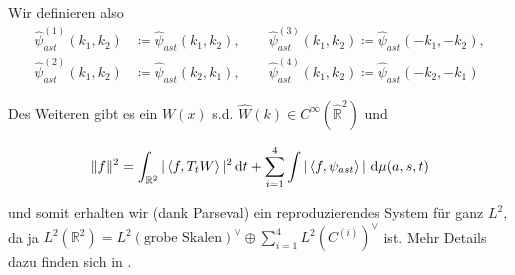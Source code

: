 Wir definieren also
\begin{align}
    \hat \psi_{ast}^{(1)} (k_1, k_2) &\coloneqq \hat\psi_{ast} (k_1,k_2),
    \qquad
    \hat\psi_{ast}^{(3)}(k_1,k_2) \coloneqq \hat\psi_{ast} (-k_1,-k_2),
    \nonumber\\
    \hat \psi_{ast}^{(2)} (k_1, k_2) &\coloneqq \hat\psi_{ast} (k_2,k_1),
    \qquad
    \hat\psi_{ast}^{(4)}(k_1, k_2) \coloneqq \hat\psi_{ast} (-k_2,-k_1)
    \label{eq:psi(i)}
\end{align}

Des Weiteren gibt es ein $W(x)$ s.d. $\hat W(k) \in C^\infty (\hat{\mathbb{R}}^2)$ und

\begin{align*}
    \Vert f \Vert^2 =
    \int_{\mathbb{R}^2} |\left\langle f, T_t W \right\rangle|^2 \mathop{}\!\mathrm{d} t
    + \sum_{i=1}^4 \int |\left\langle f, \psi_{ast} \right\rangle|
    \, \mathop{}\!\mathrm{d} \mu (a,s,t)
\end{align*}

und somit erhalten wir (dank Parseval) ein reproduzierendes System für ganz $L^2$, da ja
$L^2 (\mathbb{R}^2) = L^2 (\textrm{grobe Skalen})^\vee \oplus \sum_{i=1}^4 L^2 \left(C^{(i)}\right)^\vee$ ist. Mehr Details dazu finden sich in \cite[S. 28 ff]{Kutyniok2008}.






